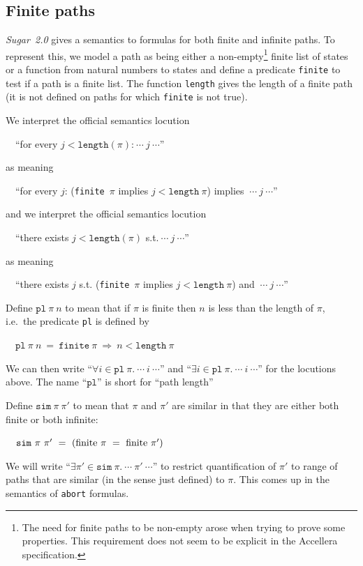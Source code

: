 \documentclass{llncs}
\newcommand{\pl}{\texttt{pl}\xspace}
\renewcommand{\sim}{\texttt{sim}\xspace}
\newcommand\Sugar{{\it{Sugar~2.0}}\xspace}
\renewcommand{\t}[1]{\texttt{#1}}
\begin{document}
\subsection{Finite paths}\label{finite}

\Sugar gives a semantics to formulas for both finite and infinite
paths.  To represent this, we model a path as being either a 
non-empty\footnote{The need for finite paths to be non-empty arose
when trying to prove some properties. This requirement does not seem to be explicit in
the Accellera specification.} finite
list of states or a function from natural numbers to states and define a
predicate \t{finite} to test if a path is a finite list. The function
\t{length} gives the length of a finite path (it is not defined on
paths for which \t{finite} is not true).

\noindent We interpret the official semantics locution 

~~``for every $j < \t{length}(\pi)$:$~\cdots~j~\cdots$''

\noindent as meaning 

~~``for every $j$: (\t{finite}~$\pi$ implies $j < \t{length}~\pi$) implies $~\cdots~j~\cdots$''

\noindent and we interpret the official semantics locution 

~~``there exists $j < \t{length}(\pi)$ s.t.$~\cdots~j~\cdots$''

\noindent as meaning 

~~``there exists $j$ s.t. (\t{finite}~$\pi$ implies $j < \t{length}~\pi$) and $~\cdots~j~\cdots$''

Define ${\pl~\pi~n}$ to mean that
if $\pi$ is finite then $n$ is
less than the length of $\pi$, i.e.~the predicate \pl is defined by

~~$\pl~\pi~n~=~\t{finite}~\pi~\Rightarrow~ n < \t{length}~\pi$

We can then write ``$\forall i\in\pl~\pi.~\cdots~i~\cdots$'' and ``$\exists i\in\pl~\pi.~\cdots~i~\cdots$''
for the locutions above. The name ``$\pl$'' is short for ``path length''

Define $\sim~\pi~\pi'$ to mean that $\pi$ and $\pi'$ are similar in that they are
either both finite or both infinite:

~~$\sim~\pi~\pi'~=~(\rm{finite}~\pi~=~\rm{finite}~\pi')$

We will write ``$\exists \pi'\in\sim~\pi.~\cdots~\pi'~\cdots$'' to restrict quantification
of $\pi'$ to range of paths that are similar (in the sense just defined) to $\pi$. This
comes up in the semantics of \texttt{abort} formulas.
\end{document}
